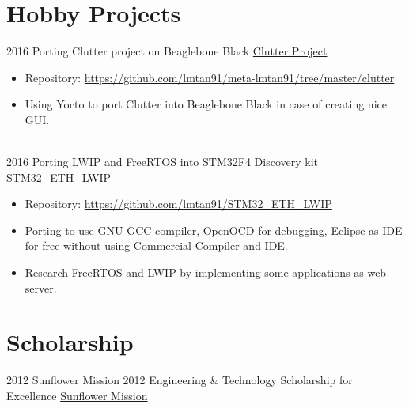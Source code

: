 \documentclass[letterpaper]{twentysecondcv} %
\begin{document}
\section{Hobby Projects}
\begin{twenty}
	\twentyitem
	{2016}
	{}
	{Porting Clutter project on Beaglebone Black}
	{\href{https://blogs.gnome.org/clutter/}{Clutter Project}}
	{}
	{
		{\begin{itemize}
		\item Repository: \url{https://github.com/lmtan91/meta-lmtan91/tree/master/clutter}
		\item Using Yocto to port Clutter into Beaglebone Black in case of creating nice GUI.
		\end{itemize}}
	}
	\\
	\twentyitem
	{2016}
	{}
	{Porting LWIP and FreeRTOS into STM32F4 Discovery kit}
	{\href{https://github.com/lmtan91/STM32\_ETH\_LWIP}{STM32\_ETH\_LWIP}}
	{}
	{
		{\begin{itemize}
		\item Repository: \url{https://github.com/lmtan91/STM32\_ETH\_LWIP}
		\item Porting to use GNU GCC compiler, OpenOCD for debugging, Eclipse as IDE for free without using Commercial Compiler and IDE.
		\item Research FreeRTOS and LWIP by implementing some applications as web server.
		\end{itemize}}
	}
\end{twenty}

\section{Scholarship}
\begin{twenty}
	\twentyitem
	{2012}
	{}
	{Sunflower Mission 2012 Engineering \& Technology Scholarship for Excellence}
	{\href{https://www.esilicon.com/company/careers/scholarships-in-vietnam}{Sunflower Mission}}
	{}
	
\end{twenty}
\end{document}

